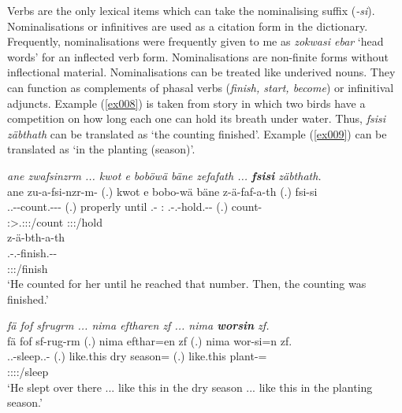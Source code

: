 Verbs are the only lexical items which can take the nominalising suffix (\emph{-si}). Nominalisations or infinitives are used as a citation form in the dictionary. Frequently, nominalisations were frequently given to me as \emph{zokwasi ebar} `head words' for an inflected verb form. Nominalisations are non-finite forms without inflectional material. Nominalisations can be treated like underived nouns. They can function as complements of phasal verbs (\textit{finish, start, become}) or infinitival adjuncts. Example (\ref{ex008}) is taken from story in which two birds have a competition on how long each one can hold its breath under water. Thus, \emph{fsisi zäbthath} can be translated as `the counting finished'. Example (\ref{ex009}) can be translated as `in the planting (season)'.

\begin{exe}
	\ex \textit{ane zwafsinzrm ... kwot e boböwä bäne zefafath ... \textbf{fsisi} \linebreak zäbthath.}\\
	\glll ane zu-a-fsi-nzr-m-\Zero{} (.) kwot e bobo-wä bäne z-ä-faf-a-th (.) fsi-si\\
	\Dem{} \Tsg.\F.\Betatwo-\Vc-count.\Ext-\Ndu-\Dur-\Stsg{} (.) properly until \Med{}.\All{}-\Emph{} \Dem{}:\Med{} \M.\Gam-\Vc.\Ndu-hold.\Rs-\Pst-\Stnsg{} (.) count-\Nmlz{}\\
	{} \footnotesize{\Stsg:\Sbj>\Tsg.\F:\Io:\Pst:\Dur/count} {} {} {} {} {} \footnotesize{\Stpl:\Sbj:\Pst:\Pfv/hold} {} {}\\
	\sn
	\glll z-ä-bth-a-th\\
	\M.\Gam-\Vc.\Ndu-finish.\Rs-\Pst-\Stnsg{}\\
	\footnotesize{\Stpl:\Sbj:\Pst:\Pfv/finish}\\
	\trans `He counted for her until he reached that number. Then, the counting was finished.' 
	\label{ex008}
\end{exe}
\begin{exe}
	\ex \textit{fä fof sfrugrm ... nima eftharen zf ... nima \textbf{worsin} zf.}\\
	\glll fä fof sf-rug-rm (.) nima efthar=en zf (.) nima wor-si=n zf.\\
	\Dist{} \Emph{} \Tsg.\M.\Betatwo-sleep.\Ext.\Ndu-\Dur{} (.) {like.this} {dry season=\Loc} \Imm{} (.) {like.this} plant-\Nmlz=\Loc{} \Imm\\
	{} {} \footnotesize{\Tsg:\M:\Sbj:\Pst:\Dur/sleep} {} {} {} {} {} {} {} {}\\
	\trans `He slept over there ... like this in the dry season ... like this in the planting season.' 
	\label{ex009}
\end{exe}


